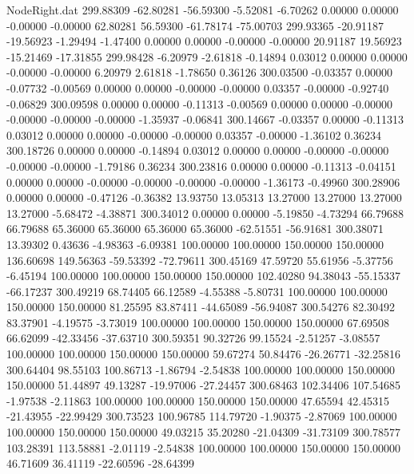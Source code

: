 \begin{filecontents}{NodeRight.dat}
 299.88309  -62.80281  -56.59300    -5.52081   -6.70262    0.00000    0.00000   -0.00000   -0.00000   62.80281   56.59300  -61.78174  -75.00703
 299.93365  -20.91187  -19.56923    -1.29494   -1.47400    0.00000    0.00000   -0.00000   -0.00000   20.91187   19.56923  -15.21469  -17.31855
 299.98428   -6.20979   -2.61818    -0.14894    0.03012    0.00000    0.00000   -0.00000   -0.00000    6.20979    2.61818   -1.78650    0.36126
 300.03500   -0.03357    0.00000    -0.07732   -0.00569    0.00000    0.00000   -0.00000   -0.00000    0.03357   -0.00000   -0.92740   -0.06829
 300.09598    0.00000    0.00000    -0.11313   -0.00569    0.00000    0.00000   -0.00000   -0.00000   -0.00000   -0.00000   -1.35937   -0.06841
 300.14667   -0.03357    0.00000    -0.11313    0.03012    0.00000    0.00000   -0.00000   -0.00000    0.03357   -0.00000   -1.36102    0.36234
 300.18726    0.00000    0.00000    -0.14894    0.03012    0.00000    0.00000   -0.00000   -0.00000   -0.00000   -0.00000   -1.79186    0.36234
 300.23816    0.00000    0.00000    -0.11313   -0.04151    0.00000    0.00000   -0.00000   -0.00000   -0.00000   -0.00000   -1.36173   -0.49960
 300.28906    0.00000    0.00000    -0.47126   -0.36382   13.93750   13.05313   13.27000   13.27000   13.27000   13.27000   -5.68472   -4.38871
 300.34012    0.00000    0.00000    -5.19850   -4.73294   66.79688   66.79688   65.36000   65.36000   65.36000   65.36000  -62.51551  -56.91681
 300.38071   13.39302    0.43636    -4.98363   -6.09381  100.00000  100.00000  150.00000  150.00000  136.60698  149.56363  -59.53392  -72.79611
 300.45169   47.59720   55.61956    -5.37756   -6.45194  100.00000  100.00000  150.00000  150.00000  102.40280   94.38043  -55.15337  -66.17237
 300.49219   68.74405   66.12589    -4.55388   -5.80731  100.00000  100.00000  150.00000  150.00000   81.25595   83.87411  -44.65089  -56.94087
 300.54276   82.30492   83.37901    -4.19575   -3.73019  100.00000  100.00000  150.00000  150.00000   67.69508   66.62099  -42.33456  -37.63710
 300.59351   90.32726   99.15524    -2.51257   -3.08557  100.00000  100.00000  150.00000  150.00000   59.67274   50.84476  -26.26771  -32.25816
 300.64404   98.55103  100.86713    -1.86794   -2.54838  100.00000  100.00000  150.00000  150.00000   51.44897   49.13287  -19.97006  -27.24457
 300.68463  102.34406  107.54685    -1.97538   -2.11863  100.00000  100.00000  150.00000  150.00000   47.65594   42.45315  -21.43955  -22.99429
 300.73523  100.96785  114.79720    -1.90375   -2.87069  100.00000  100.00000  150.00000  150.00000   49.03215   35.20280  -21.04309  -31.73109
 300.78577  103.28391  113.58881    -2.01119   -2.54838  100.00000  100.00000  150.00000  150.00000   46.71609   36.41119  -22.60596  -28.64399

\end{filecontents}
